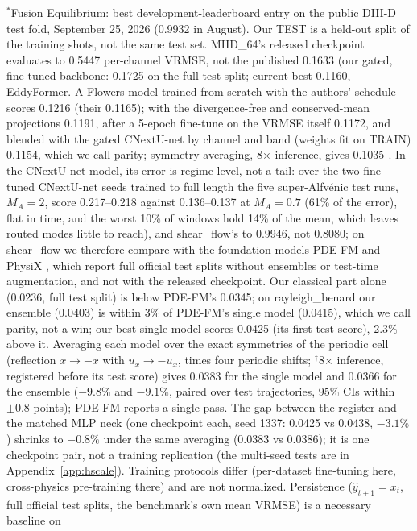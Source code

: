 \documentclass{article}
\begin{document}
$^\ast$Fusion Equilibrium: best development-leaderboard entry on the public DIII-D test fold, September 25, 2026 (0.9932 in August). Our TEST is a held-out split of the training shots, not the same test set.
MHD\_64's released checkpoint evaluates to 0.5447 per-channel VRMSE, not the published 0.1633 (our gated, fine-tuned
backbone: 0.1725 on the full test split; current best 0.1160, EddyFormer. A Flowers model trained from scratch with the authors' schedule scores 0.1216 (their 0.1165); with the divergence-free and conserved-mean projections 0.1191, after a 5-epoch fine-tune on the VRMSE itself 0.1172, and blended with the gated CNextU-net by channel and band (weights fit on TRAIN) 0.1154, which we call parity; symmetry averaging, 8$\times$ inference, gives 0.1035$^\dagger$. In the CNextU-net model, its error is regime-level, not a tail: over the two
fine-tuned CNextU-net seeds trained to full length the five super-Alfv\'enic test runs, $M_A{=}2$, score 0.217--0.218 against
0.136--0.137 at $M_A{=}0.7$ (61\% of the error), flat in time, and the worst 10\% of windows hold 14\% of the mean, which leaves routed modes little to reach), and shear\_flow's to
0.9946, not 0.8080; on shear\_flow we therefore compare with the foundation models PDE-FM \citep{soares2025pdefm} and
PhysiX \citep{nguyen2025physix}, which report full official test splits without ensembles or test-time augmentation,
and not with the released checkpoint. Our classical part alone (0.0236, full test split) is below PDE-FM's 0.0345; on
rayleigh\_benard our ensemble (0.0403) is within 3\% of PDE-FM's single model (0.0415), which we call parity, not a win; our best single model scores 0.0425 (its first test score), 2.3\% above it. Averaging each model over the exact symmetries of the periodic cell (reflection $x\to-x$ with $u_x\to-u_x$, times four periodic shifts; $^\dagger$8$\times$ inference, registered before its test score) gives 0.0383 for the single model and 0.0366 for the ensemble ($-9.8\%$ and $-9.1\%$, paired over test trajectories, 95\% CIs within $\pm0.8$ points); PDE-FM reports a single pass. The gap between the register and the matched MLP neck (one checkpoint each, seed 1337: 0.0425 vs 0.0438, $-3.1\%$) shrinks to $-0.8\%$ under the same averaging (0.0383 vs 0.0386); it is one checkpoint pair, not a training replication (the multi-seed tests are in Appendix~\ref{app:hscale}).
Training protocols differ (per-dataset fine-tuning here, cross-physics pre-training there) and are not normalized.
Persistence ($\hat y_{t+1}=x_t$, full official test splits, the benchmark's own mean VRMSE) is a necessary baseline on
\end{document}
